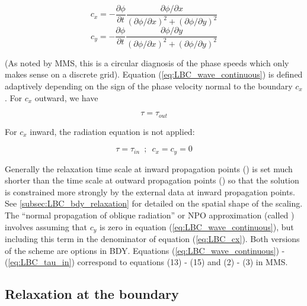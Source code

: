 \documentclass[../main/NEMO_manual]{subfiles}
\begin{document}
\begin{equation}
  \label{eq:LBC_cx}
  c_x = -\frac{\partial\phi}{\partial t}\frac{\partial\phi / \partial x}{(\partial\phi /\partial x)^2 + (\partial\phi /\partial y)^2}
\end{equation}
\begin{equation}
  \label{eq:LBC_cy}
  c_y = -\frac{\partial\phi}{\partial t}\frac{\partial\phi / \partial y}{(\partial\phi /\partial x)^2 + (\partial\phi /\partial y)^2}
\end{equation}

(As noted by MMS, this is a circular diagnosis of the phase speeds which only makes sense on a discrete grid).
Equation (\autoref{eq:LBC_wave_continuous}) is defined adaptively depending on the sign of the phase velocity normal to the boundary $c_x$.
For $c_x$ outward, we have

\begin{equation}
\tau = \tau_{out}
\end{equation}

For $c_x$ inward, the radiation equation is not applied:

\begin{equation}
  \label{eq:LBC_tau_in}
  \tau = \tau_{in}\,\,\,;\,\,\, c_x = c_y = 0
\end{equation}

Generally the relaxation time scale at inward propagation points () is set much shorter than the time scale at outward propagation
points () so that the solution is constrained more strongly by the external data at inward propagation points.
See \autoref{subsec:LBC_bdy_relaxation} for detailed on the spatial shape of the scaling.\\
The ``normal propagation of oblique radiation'' or NPO approximation (called ) involves assuming
that $c_y$ is zero in equation (\autoref{eq:LBC_wave_continuous}), but including
this term in the denominator of equation (\autoref{eq:LBC_cx}). Both versions of the scheme are options in BDY. Equations
(\autoref{eq:LBC_wave_continuous}) - (\autoref{eq:LBC_tau_in}) correspond to equations (13) - (15) and (2) - (3) in MMS.\\

\subsection{Relaxation at the boundary}
\label{subsec:LBC_bdy_relaxation}
\end{document}

